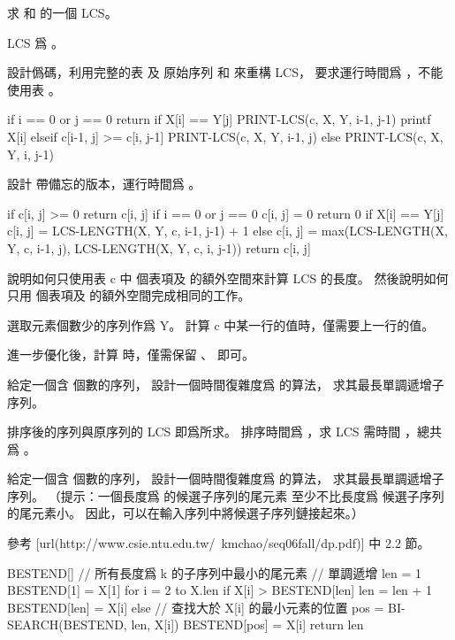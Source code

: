 \startsection[
  title={Longest common subsequence},
  reference=section:lcs,
]

\startEXERCISE
求  和  的一個 LCS。
\stopEXERCISE

\startANSWER
LCS 爲 。

\externalfigure[output/e15_4_1-1]
\stopANSWER

\startEXERCISE
設計僞碼，利用完整的表  及
原始序列 
和  來重構 LCS，
要求運行時間爲 ，不能使用表 。
\stopEXERCISE

\startANSWER
{}
\startCLRS
if i == 0 or j == 0
	return
if X[i] == Y[j]
	PRINT-LCS(c, X, Y, i-1, j-1)
	printf X[i]
elseif c[i-1, j] >= c[i, j-1]
	PRINT-LCS(c, X, Y, i-1, j)
else
	PRINT-LCS(c, X, Y, i, j-1)
\stopCLRS
\stopANSWER

\startEXERCISE
設計  帶備忘的版本，運行時間爲 。
\stopEXERCISE

\startANSWER
{}
\startCLRS
if c[i, j] >= 0
	return c[i, j]
if i == 0 or j == 0
	c[i, j] = 0
	return 0
if X[i] == Y[j]
	c[i, j] = LCS-LENGTH(X, Y, c, i-1, j-1) + 1
else
	c[i, j] = max(LCS-LENGTH(X, Y, c, i-1, j), LCS-LENGTH(X, Y, c, i, j-1))
return c[i, j]
\stopCLRS
\stopANSWER

\startEXERCISE
說明如何只使用表 c 中  個表項及  的額外空間來計算 LCS 的長度。
然後說明如何只用  個表項及  的額外空間完成相同的工作。
\stopEXERCISE

\startANSWER
選取元素個數少的序列作爲 Y。
計算 c 中某一行的值時，僅需要上一行的值。

進一步優化後，計算  時，僅需保留
、
 即可。
\stopANSWER

\startEXERCISE
給定一個含  個數的序列，
設計一個時間復雜度爲  的算法，
求其最長單調遞增子序列。
\stopEXERCISE

\startANSWER
排序後的序列與原序列的 LCS 即爲所求。
排序時間爲 ，求 LCS 需時間 ，總共爲 。
\stopANSWER

\startEXERCISE\DIFFICULT
給定一個含  個數的序列，
設計一個時間復雜度爲  的算法，
求其最長單調遞增子序列。
（{\EMP 提示：}一個長度爲  的候選子序列的尾元素
至少不比長度爲  候選子序列的尾元素小。
因此，可以在輸入序列中將候選子序列鏈接起來。）
\stopEXERCISE

\startANSWER
參考 
[url(http://www.csie.ntu.edu.tw/~kmchao/seq06fall/dp.pdf)] 中 2.2 節。

\startCLRS
BESTEND[]	// 所有長度爲 k 的子序列中最小的尾元素
		// 單調遞增
len = 1
BESTEND[1] = X[1]
for i = 2 to X.len
	if X[i] > BESTEND[len]
		len = len + 1
		BESTEND[len] = X[i]
	else
		// 查找大於 X[i] 的最小元素的位置
		pos = BI-SEARCH(BESTEND, len, X[i])
		BESTEND[pos] = X[i]
return len
\stopCLRS
\stopANSWER

\stopsection
